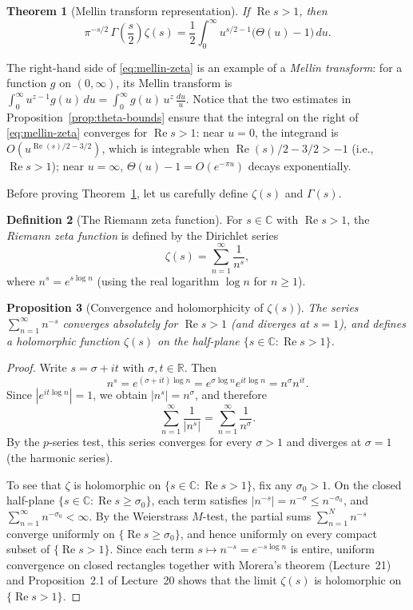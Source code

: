 \documentclass[11pt]{article}
\theoremstyle{plain}
\newtheorem{theorem}{Theorem}[section]
\newtheorem{proposition}[theorem]{Proposition}
\theoremstyle{definition}
\newtheorem{definition}[theorem]{Definition}
\theoremstyle{boldremark}
\theoremstyle{remark}
\numberwithin{equation}{section}
\newcommand{\C}{\mathbb{C}}
\newcommand{\R}{\mathbb{R}}
\DeclareMathOperator{\Real}{Re}
\begin{document}
\begin{theorem}[Mellin transform representation]\label{thm:mellin-zeta}
If $\Real s > 1$, then
\begin{equation}\label{eq:mellin-zeta}
 \boxed{\displaystyle
  \pi^{-s/2}\,\Gamma\!\left(\frac{s}{2}\right)\zeta(s)
  = \frac{1}{2}\int_0^{\infty} u^{s/2-1}\bigl(\Theta(u)-1\bigr)\,du.}
\end{equation}
\end{theorem}

The right-hand side of \eqref{eq:mellin-zeta} is an example of a
\emph{Mellin transform}: for a function $g$ on $(0,\infty)$, its Mellin
transform is $\int_0^{\infty} u^{z-1}g(u)\,du = \int_0^{\infty} g(u)\,u^z\,\frac{du}{u}$.
Notice that the two estimates in Proposition~\ref{prop:theta-bounds} ensure
that the integral on the right of \eqref{eq:mellin-zeta} converges for
$\Real s > 1$: near $u=0$, the integrand is $O(u^{\Real(s)/2-3/2})$, which
is integrable when $\Real(s)/2 - 3/2 > -1$ (i.e., $\Real s > 1$); near
$u=\infty$, $\Theta(u)-1 = O(e^{-\pi u})$ decays exponentially.

Before proving Theorem~\ref{thm:mellin-zeta}, let us carefully define
$\zeta(s)$ and $\Gamma(s)$.

\begin{definition}[The Riemann zeta function]
For $s\in\C$ with $\Real s > 1$, the \emph{Riemann zeta function} is
defined by the Dirichlet series
\[
 \zeta(s) = \sum_{n=1}^{\infty}\frac{1}{n^s},
\]
where $n^s = e^{s\log n}$ (using the real logarithm $\log n$ for $n\geq 1$).
\end{definition}

\begin{proposition}[Convergence and holomorphicity of $\zeta(s)$]\label{prop:zeta-hol}
The series $\sum_{n=1}^{\infty} n^{-s}$ converges absolutely for
$\Real s > 1$ (and diverges at $s=1$), and defines a holomorphic function
$\zeta(s)$ on the half-plane $\{s\in\C:\Real s > 1\}$.
\end{proposition}

\begin{proof}
Write $s=\sigma+it$ with $\sigma,t\in\R$. Then
\[
 n^s = e^{(\sigma+it)\log n} = e^{\sigma\log n}e^{it\log n} = n^{\sigma}n^{it}.
\]
Since $|e^{it\log n}|=1$, we obtain $|n^s|=n^{\sigma}$, and therefore
\[
 \sum_{n=1}^{\infty}\frac{1}{|n^s|} = \sum_{n=1}^{\infty}\frac{1}{n^{\sigma}}.
\]
By the $p$-series test, this series converges for every $\sigma > 1$ and
diverges at $\sigma = 1$ (the harmonic series).

To see that $\zeta$ is holomorphic on $\{s\in\C:\Real s > 1\}$, fix any
$\sigma_0 > 1$. On the closed half-plane $\{s\in\C:\Real s \geq \sigma_0\}$,
each term satisfies $|n^{-s}|=n^{-\sigma}\leq n^{-\sigma_0}$, and
$\sum_{n=1}^{\infty} n^{-\sigma_0}<\infty$. By the Weierstrass $M$-test,
the partial sums $\sum_{n=1}^{N} n^{-s}$ converge uniformly on
$\{\Real s \geq \sigma_0\}$, and hence uniformly on every compact subset of
$\{\Real s > 1\}$. Since each term $s\mapsto n^{-s}=e^{-s\log n}$ is entire, uniform
convergence on closed rectangles together with Morera's theorem
(Lecture~21) and Proposition~2.1 of Lecture~20 shows that the limit
$\zeta(s)$ is holomorphic on $\{\Real s > 1\}$.
\end{proof}
\end{document}
